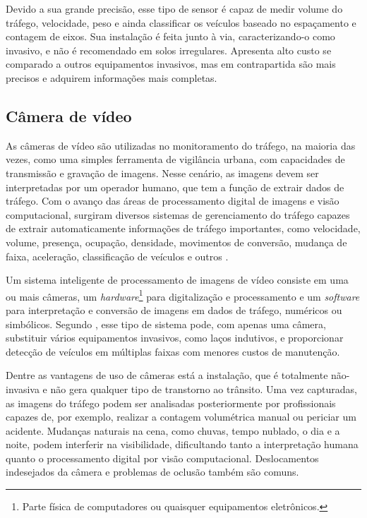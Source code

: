 Devido a sua grande precisão, esse tipo de sensor é capaz de medir volume do tráfego, velocidade, peso e ainda classificar os veículos baseado no espaçamento e contagem de eixos. Sua instalação é feita junto à via, caracterizando-o como invasivo, e não é recomendado em solos irregulares. Apresenta alto custo se comparado a outros equipamentos invasivos, mas em contrapartida são mais precisos e adquirem informações mais completas.


\subsection{Câmera de vídeo} %
\label{sub:c_mera_de_v_deo}

As câmeras de vídeo são utilizadas no monitoramento do tráfego, na maioria das vezes, como uma simples ferramenta de vigilância urbana, com capacidades de transmissão e gravação de imagens. Nesse cenário, as imagens devem ser interpretadas por um operador humano, que tem a função de extrair dados de tráfego. Com o avanço das áreas de processamento digital de imagens e visão computacional, surgiram diversos sistemas de gerenciamento do tráfego capazes de extrair automaticamente informações de tráfego importantes, como velocidade, volume, presença, ocupação, densidade, movimentos de conversão, mudança de faixa, aceleração, classificação de veículos e outros \citep{martinsky:2007:masther,feitosa:2012:masther}.

Um sistema inteligente de processamento de imagens de vídeo consiste em uma ou mais câmeras, um \textit{hardware}\footnote{Parte física de computadores ou quaisquer equipamentos eletrônicos.} para digitalização e processamento e um \textit{software} para interpretação e conversão de imagens em dados de tráfego, numéricos ou simbólicos. Segundo \cite{feitosa:2012:masther}, esse tipo de sistema pode, com apenas uma câmera, substituir vários equipamentos invasivos, como laços indutivos, e proporcionar detecção de veículos em múltiplas faixas com menores custos de manutenção.

Dentre as vantagens de uso de câmeras está a instalação, que é totalmente não-invasiva e não gera qualquer tipo de transtorno ao trânsito. Uma vez capturadas, as imagens do tráfego podem ser analisadas posteriormente por profissionais capazes de, por exemplo, realizar a contagem volumétrica manual ou periciar um acidente. Mudanças naturais na cena, como chuvas, tempo nublado, o dia e a noite, podem interferir na visibilidade, dificultando tanto a interpretação humana quanto o processamento digital por visão computacional. Deslocamentos indesejados da câmera e problemas de oclusão também são comuns.

